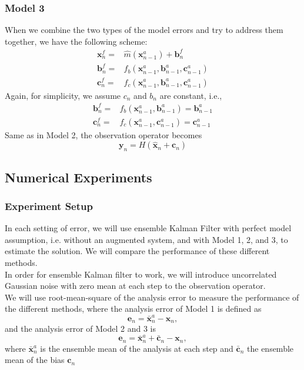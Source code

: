 \documentclass{article}
\begin{document}
\subsubsection{Model 3}
When we combine the two types of the model errors and try to address them together, we have the following scheme:
\begin{align}
\pmb{x}_{n}^{f}=&\hat{m}(\pmb{x}_{n-1}^{a})+\pmb{b}_{n}^{f}\\
\pmb{b}_{n}^{f}=&f_{b}(\pmb{x}_{n-1}^{a},\pmb{b}_{n-1}^{a},\pmb{c}_{n-1}^{a})\\
\pmb{c}_{n}^{f}=&f_{c}(\pmb{x}_{n-1}^{a},\pmb{b}_{n-1}^{a},\pmb{c}_{n-1}^{a})
\end{align}
Again, for simplicity, we assume $c_n$ and $b_n$ are constant, i.e.,
\begin{align}
\pmb{b}_{n}^{f}=&f_{b}(\pmb{x}_{n-1}^{a},\pmb{b}_{n-1}^{a})=\pmb{b}_{n-1}^{a}\\
\pmb{c}_{n}^{f}=&f_{c}(\pmb{x}_{n-1}^{a},\pmb{c}_{n-1}^{a})=\pmb{c}_{n-1}^{a}
\end{align}
Same as in Model 2, the observation operator becomes
\begin{equation}
\pmb{y}_n=H(\hat{\pmb{x}}_n+\pmb{c}_n)
\end{equation}
\subsection{Numerical Experiments}
\subsubsection{Experiment Setup}
In each setting of error, we will use ensemble Kalman Filter with perfect model assumption, i.e. without an augmented system, and with Model 1, 2, and 3, to estimate the solution. We will compare the performance of these different methods.\\
In order for ensemble Kalman filter to work, we will introduce uncorrelated Gaussian noise with zero mean at each step to the observation operator.\\
We will use root-mean-square of the analysis error to measure the performance of the different methods, where the analysis error of Model 1 is defined as
\begin{equation}
\pmb{e}_n=\bar{\pmb{x}}_n^a-\pmb{x}_n,
\end{equation}
and the analysis error of Model 2 and 3 is
\begin{equation}
\pmb{e}_n=\bar{\pmb{x}}_n^a+\bar{\pmb{c}}_n-\pmb{x}_n,
\end{equation}
where $\bar{\pmb{x}}_n^a$ is the ensemble mean of the analysis at each step and $\bar{\pmb{c}}_n$ the ensemble mean of the bias $\pmb{c}_n$
\end{document}
